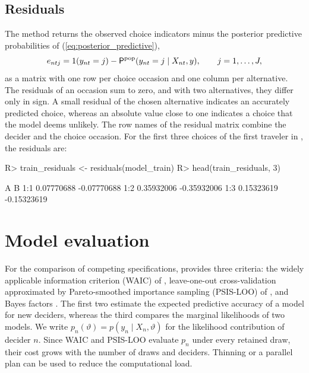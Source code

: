 \documentclass[article,shortnames]{jss}
\newcommand{\fct}[1]{\code{#1()}}
\begin{document}
\subsection{Residuals} \label{sec:residuals}

The \fct{residuals} method returns the observed choice indicators minus the
posterior predictive probabilities of (\ref{eq:posterior_predictive}),
%
\begin{equation}
\label{eq:residuals}
e_{ntj} = 1(y_{nt} = j)
  - \mathsf{P}^{\mathrm{pop}}(y_{nt} = j \mid X_{nt}, y),
\qquad j = 1, \dots, J,
\end{equation}
%
as a matrix with one row per choice occasion and one column per alternative. The
residuals of an occasion sum to zero, and with two alternatives, they differ
only in sign. A small residual of the chosen alternative indicates an accurately
predicted choice, whereas an absolute value close to one indicates a choice that
the model deems unlikely. The row names of the residual matrix combine the
decider and the choice occasion. For the first three choices of the first
traveler in , the residuals are:
%
\begin{Schunk}
\begin{Sinput}
R> train_residuals <- residuals(model_train)
R> head(train_residuals, 3)
\end{Sinput}
\begin{Soutput}
             A           B
1:1 0.07770688 -0.07770688
1:2 0.35932006 -0.35932006
1:3 0.15323619 -0.15323619
\end{Soutput}
\end{Schunk}

\section{Model evaluation} \label{sec:evaluation}

For the comparison of competing specifications,  provides three
criteria: the widely applicable information criterion (WAIC) of
\citet{Watanabe2010}, leave-one-out cross-validation approximated by
Pareto-smoothed importance sampling (PSIS-LOO) of \citet{Vehtari2017,
Vehtari2024}, and Bayes factors \citep{Kass1995}. The first two estimate the
expected predictive accuracy of a model for new deciders, whereas the third
compares the marginal likelihoods of two models. We write $p_n(\vartheta) =
p(y_n \mid X_n, \vartheta)$ for the likelihood contribution of decider $n$.
Since WAIC and PSIS-LOO evaluate $p_n$ under every retained draw, their cost
grows with the number of draws and deciders. Thinning or a parallel 
plan can be used to reduce the computational load.
\end{document}
